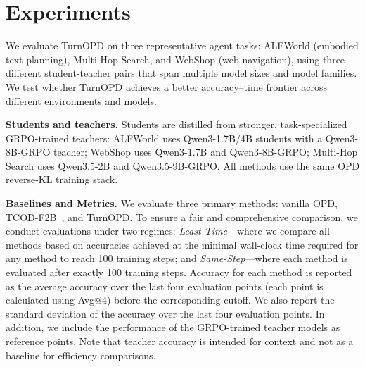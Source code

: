 ﻿\section{Experiments}
\label{sec:exp}
We evaluate TurnOPD on three representative agent tasks: ALFWorld (embodied text planning), Multi-Hop Search, and WebShop (web navigation), using three different student-teacher pairs that span multiple model sizes and model families. 
We test whether TurnOPD achieves a better accuracy--time frontier across different environments and models.

\textbf{Students and teachers.} 
Students are distilled from stronger, task-specialized GRPO-trained teachers: ALFWorld uses Qwen3-1.7B/4B students with a Qwen3-8B-GRPO teacher; WebShop uses Qwen3-1.7B and Qwen3-8B-GRPO; Multi-Hop Search uses Qwen3.5-2B and Qwen3.5-9B-GRPO. All methods use the same OPD reverse-KL training stack.

\textbf{Baselines and Metrics.} We evaluate three primary methods: vanilla OPD, TCOD-F2B~\citep{wang2026tcod}, and TurnOPD. To ensure a fair and comprehensive comparison, we conduct evaluations under two regimes: \textit{Least-Time}—where we compare all methods based on accuracies achieved at the minimal wall-clock time required for any method to reach 100 training steps; and \textit{Same-Step}—where each method is evaluated after exactly 100 training steps. Accuracy for each method is reported as the average accuracy over the last four evaluation points (each point is calculated using Avg@4) before the corresponding cutoff. We also report the standard deviation of the accuracy over the last four evaluation points.
In addition, we include the performance of the GRPO-trained teacher models as reference points. Note that teacher accuracy is intended for context and not as a baseline for efficiency comparisons.


